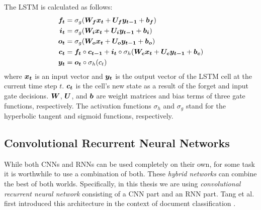 The LSTM is calculated as follows:
$$
  \begin{aligned}
\boldsymbol{f_t} &= \sigma_g(\boldsymbol{W_{f}} \boldsymbol{x_t} + \boldsymbol{U_{f}} \boldsymbol{y_{t-1}} + \boldsymbol{b_f}) \\
\boldsymbol{i_t} &= \sigma_g(\boldsymbol{W_{i}} \boldsymbol{x_t} + \boldsymbol{U_{i}} \boldsymbol{y_{t-1}} + \boldsymbol{b_i}) \\
\boldsymbol{o_t} &= \sigma_g(\boldsymbol{W_{o}} \boldsymbol{x_t} + \boldsymbol{U_{o}} \boldsymbol{y_{t-1}} + \boldsymbol{b_o}) \\
\boldsymbol{c_t} &= \boldsymbol{f_t} \circ \boldsymbol{c_{t-1}} + \boldsymbol{i_t} \circ \sigma_h(\boldsymbol{W_{c}} \boldsymbol{x_t} + \boldsymbol{U_{c}} \boldsymbol{y_{t-1}} + \boldsymbol{b_c}) \\
\boldsymbol{y_t} &= \boldsymbol{o_t} \circ \sigma_h(c_t)
  \end{aligned}
$$
where $\boldsymbol{x_t}$ is an input vector and $\boldsymbol{y_t}$ is the output vector of the LSTM cell at the current time step $t$. $\boldsymbol{c_t}$ is the cell's new state as a result of the forget and input gate decisions. $\boldsymbol{W}$, $\boldsymbol{U}$, and $\boldsymbol{b}$ are weight matrices and bias terms of three gate functions, respectively. The activation functions $\sigma_h$ and $\sigma_g$ stand for the hyperbolic tangent and sigmoid functions, respectively.


\subsection{Convolutional Recurrent Neural Networks}
\label{sec:hybrid_networks}
While both CNNs and RNNs can be used completely on their own, for some task it is worthwhile to use a combination of both. These \emph{hybrid networks} can combine the best of both worlds. Specifically, in this thesis we are using \emph{convolutional recurrent neural network} consisting of a CNN part and an RNN part. Tang et al. first introduced this architecture in the context of document classification \cite{tang2015document}.

